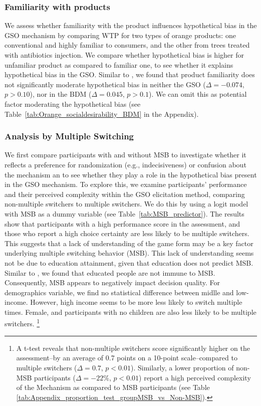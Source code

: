 \documentclass[12pt]{article}
\begin{document}
\subsubsection{Familiarity with products}
We assess whether familiarity with the product influences hypothetical bias in the GSO mechanism by comparing WTP for two types of orange products: one conventional and highly familiar to consumers, and the other from trees treated with antibiotics injection. We compare whether hypothetical bias is higher for unfamiliar product as compared to familiar one, to see whether it explains hypothetical bias in the GSO. Similar to \citet{veettil_hypothetical_2024},  we found that product familiarity does not significantly moderate hypothetical bias in neither the GSO (\(\Delta = -0.074\), \(p > 0.10\)), nor in the BDM (\(\Delta = 0.045\), \(p >0.1\)). We can omit this as potential factor moderating the hypothetical bias (see Table~\ref{tab:Orange_socialdesirability_BDM} in the Appendix).




\subsubsection{Analysis by Multiple Switching}
We first compare participants with and without MSB to investigate whether it reflects a preference for randomization (e.g., indecisiveness) or confusion about the mechanism an to see whether they play a role in the hypothetical bias present in the GSO mechanism. To explore this, we examine participants' performance and their perceived complexity within the GSO elicitation method, comparing non-multiple switchers to multiple switchers. We do this by using a logit model with MSB as a dummy variable (see Table~\ref{tab:MSB_predictor}). The results show that participants with a high performance score in the assessment, and those who report a high choice certainty are less likely to be multiple switchers. This suggests that a lack of understanding of the game form may be a key factor underlying multiple switching behavior (MSB). This lack of understanding seems not be due to education attainment, given that education does not predict MSB. Similar to \citet{yu2021multiple}, we found that educated people are not immune to MSB. Consequently, MSB appears to negatively impact decision quality.
For demographics variable, we find no statistical difference between midlle and low-income. However, high income seems to be more less likely to switch multiple times. Female, and participants with no children are also less likely to be multiple switchers.
\footnote{A t-test reveals that non-multiple switchers score significantly higher on the assessment--by an average of 0.7 points on a 10-point scale--compared to multiple switchers (\(\Delta = 0.7\), \(p < 0.01\)). Similarly, a lower proportion of non-MSB participants (\(\Delta = -22\%\), \(p < 0.01\)) report a high perceived complexity of the Mechanism as compared to MSB participants (see Table \ref{tab:Appendix_proportion_test_groupMSB_vs_Non-MSB}). }
\end{document}
